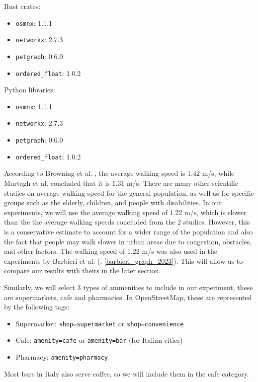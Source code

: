 Rust crates:
\begin{itemize}
    \item \verb|osmnx|: 1.1.1
    \item \verb|networkx|: 2.7.3
    \item \verb|petgraph|: 0.6.0
    \item \verb|ordered_float|: 1.0.2
\end{itemize}


Python libraries:
\begin{itemize}
    \item \verb|osmnx|: 1.1.1
    \item \verb|networkx|: 2.7.3
    \item \verb|petgraph|: 0.6.0
    \item \verb|ordered_float|: 1.0.2
\end{itemize}

According to Browning et al. \cite{browning_effects_2006}, the average walking speed is 1.42 m/s, while Murtagh et al. \cite{murtagh_outdoor_2021} concluded that it is 1.31 m/s. There are many other scientific studies on average walking speed for the general population, as well as for specific groups such as the elderly, children, and people with disabilities. In our experiments, we will use the average walking speed of 1.22 m/s, which is slower than the the average walking speeds concluded from the 2 studies. However, this is a conservative estimate to account for a wider range of the population and also the fact that people may walk slower in urban areas due to congestion, obstacles, and other factors. The walking speed of 1.22 m/s was also used in the experiments by Barbieri et al. (\cite{barbieri_graph_2023}, \ref{barbieri_graph_2023}). This will allow us to compare our results with theirs in the later section.

Similarly, we will select 3 types of ammenities to include in our experiment, these are supermarkets, cafe and pharmacies. In OpenStreetMap, these are represented by the following tags:

\begin{itemize}
    \item Supermarket: \verb|shop=supermarket| or \verb|shop=convenience|
    \item Cafe: \verb|amenity=cafe| or \verb|amenity=bar| (for Italian cities)
    \item Pharmacy: \verb|amenity=pharmacy|
\end{itemize}

Most bars in Italy also serve coffee, so we will include them in the cafe category.

